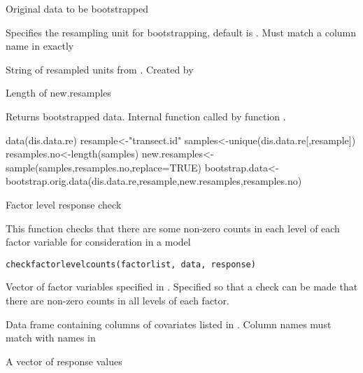 \documentclass[a4paper]{book}
\begin{document}
%
\begin{Arguments}
\begin{ldescription}
\item[\code{orig.data}] Original data to be bootstrapped

\item[\code{resample}] Specifies the resampling unit for bootstrapping, default is . Must match a column name in  exactly

\item[\code{new.resamples}] String of resampled units from . Created by 

\item[\code{resamples.no}] Length of new.resamples
\end{ldescription}
\end{Arguments}
%
\begin{Value}
Returns bootstrapped data. Internal function called by function .
\end{Value}
%
\begin{Examples}
\begin{ExampleCode}
data(dis.data.re)
resample<-"transect.id"
samples<-unique(dis.data.re[,resample])
resamples.no<-length(samples)
new.resamples<-sample(samples,resamples.no,replace=TRUE)
bootstrap.data<-bootstrap.orig.data(dis.data.re,resample,new.resamples,resamples.no)

\end{ExampleCode}
\end{Examples}
%
\begin{Description}\relax
Factor level response check

This function checks that there are some non-zero counts in each level of each factor variable for consideration in a model
\end{Description}
%
\begin{Usage}
\begin{verbatim}
checkfactorlevelcounts(factorlist, data, response)
\end{verbatim}
\end{Usage}
%
\begin{Arguments}
\begin{ldescription}
\item[\code{factorlist}] Vector of factor variables specified in .  Specified so that a check can be made that there are non-zero counts in all levels of each factor.

\item[\code{data}] Data frame containing columns of covariates listed in .  Column names must match with names in 

\item[\code{response}] A vector of response values
\end{ldescription}
\end{Arguments}
\end{document}
